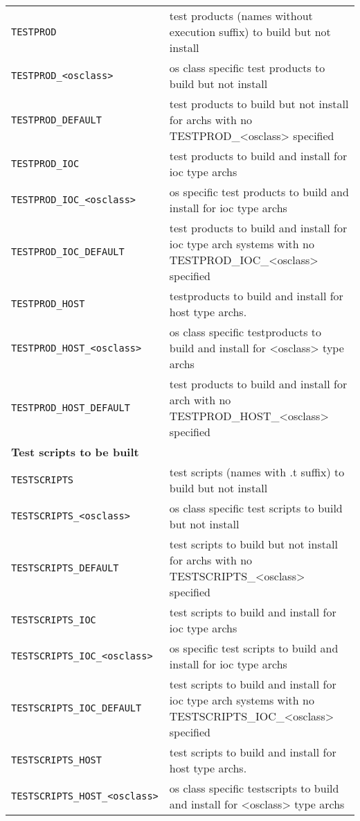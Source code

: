 \begin{center}
\begin{longtable}{p{2.94784in}p{3.76247in}}
\hline
\verb|TESTPROD| & test products (names without execution suffix) to build but not install \\
\verb|TESTPROD_<osclass>| & os class specific test products to build but not install\\
\verb|TESTPROD_DEFAULT| & test products to build but not install for archs with no TESTPROD\_\textless{}osclass\textgreater{} specified\\
\verb|TESTPROD_IOC| & test products to build and install for ioc type archs\\
\verb|TESTPROD_IOC_<osclass>| & os specific test products to build and install for ioc type archs\\
\verb|TESTPROD_IOC_DEFAULT| & test products to build and install for ioc type arch systems with no TESTPROD\_IOC\_\textless{}osclass\textgreater{} specified\\
\verb|TESTPROD_HOST| & testproducts to build and install for host type archs. \\
\verb|TESTPROD_HOST_<osclass>| & os class specific testproducts to build and install for \textless{}osclass\textgreater{} type archs\\
\verb|TESTPROD_HOST_DEFAULT| & test products to build and install for arch with no TESTPROD\_HOST\_\textless{}osclass\textgreater{} specified\\
\textbf{Test scripts to be built} & \\
\hline
\verb|TESTSCRIPTS| & test scripts (names with .t suffix) to build but not install\\
\verb|TESTSCRIPTS_<osclass>| & os class specific test scripts to build but not install\\
\verb|TESTSCRIPTS_DEFAULT| & test scripts to build but not install for archs with no TESTSCRIPTS\_\textless{}osclass\textgreater{} specified\\
\verb|TESTSCRIPTS_IOC| & test scripts to build and install for ioc type archs\\
\verb|TESTSCRIPTS_IOC_<osclass>| & os specific test scripts to build and install for ioc type archs\\
\verb|TESTSCRIPTS_IOC_DEFAULT| & test scripts to build and install for ioc type arch systems with no TESTSCRIPTS\_IOC\_\textless{}osclass\textgreater{} specified\\
\verb|TESTSCRIPTS_HOST| & test scripts to build and install for host type archs. \\
\verb|TESTSCRIPTS_HOST_<osclass>| & os class specific testscripts to build and install for \textless{}osclass\textgreater{} type archs\\

\end{longtable}
\end{center}
